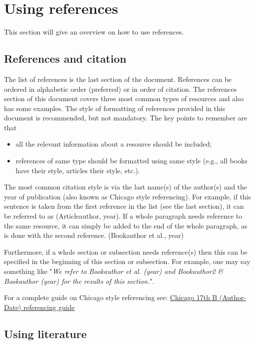 \section{Using references}

This section will give an overview on how to use references.

\subsection{References and citation}

The list of references is the last section of the document. References can be ordered in alphabetic order (preferred) or in order of citation. The references section of this document covers three most common types of resources and also has some examples. 
The style of formatting of references provided in this document is recommended, but not mandatory. The key points to remember are that 
\vspace{-2mm}
\begin{itemize}
\item all the relevant information about a resource should be included;
\item references of same type should be formatted using same style (e.g., all books have their style, articles their style, etc.).
\end{itemize}

The most common citation style is via the last name(s) of the author(s) and the year of publication (also known as Chicago style referencing). For example, if this sentence is taken from the first reference in the list (see the last section), it can be referred to as (Articleauthor, year). If a whole paragraph needs reference to the same resource, it can simply be added to the end of the whole paragraph, as is done with the second reference. (Bookauthor et al., year)

Furthermore, if a whole section or subsection needs reference(s) then this can be specified in the beginning of this section or subsection. For example, one may say something like "\textit{We refer to Bookauthor et al. (year) and Bookauthor2 \& Bookauthor (year) for the results of this section.}". 

For a complete guide on Chicago style referencing see: \href{http://libguides.library.curtin.edu.au/referencing/chicago}{Chicago 17th B (Author-Date) referencing guide}


\subsection{Using literature}

